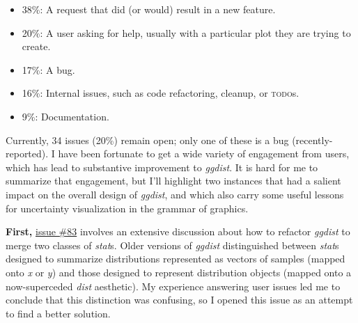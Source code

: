 \documentclass[journal]{vgtc}                     %
\begin{document}
\begin{itemize}
\setlength{\parskip}{0pt}
    \item 38\%: A request that did (or would) result in a new feature.
    \item 20\%: A user asking for help, usually with a particular plot they are trying to create.
    \item 17\%: A bug.
    \item 16\%: Internal issues, such as code refactoring, cleanup, or \textsc{todo}s.
    \item 9\%: Documentation.
\end{itemize}

Currently, 34 issues (20\%) remain open; only one of these is a bug (recently-reported). 
I have been fortunate to get a wide variety of engagement from users, which has lead to substantive improvement to \textit{ggdist}. It is hard for me to summarize that engagement, but I'll highlight two instances that had a salient impact on the overall design of \textit{ggdist}, and which also carry some useful lessons for uncertainty visualization in the grammar of graphics.

\textbf{First,} \href{https://github.com/mjskay/ggdist/issues/83}{issue \#83} involves an extensive discussion about how to refactor \textit{ggdist} to merge two classes of \textit{stat}s. Older versions of \textit{ggdist} distinguished between \textit{stat}s designed to summarize distributions represented as vectors of samples (mapped onto \textit{x} or \textit{y}) and those designed to represent distribution objects (mapped onto a now-superceded \textit{dist} aesthetic). My experience answering user issues led me to conclude that this distinction was confusing, so I opened this issue as an attempt to find a better solution. 
\end{document}
